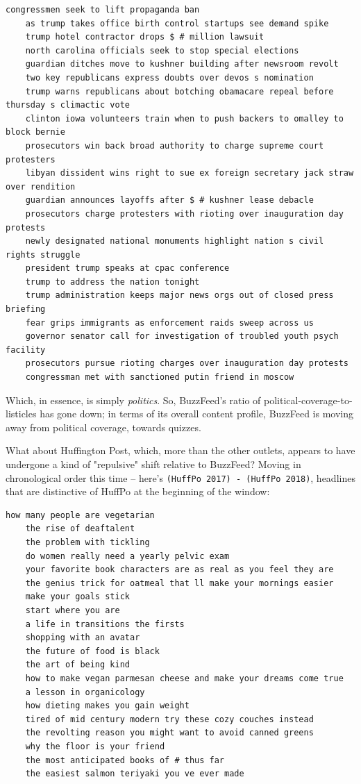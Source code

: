 \documentclass{scrartcl}
\begin{document}
\begin{lstlisting}[basicstyle=\tiny\hlfont]
    congressmen seek to lift propaganda ban
    as trump takes office birth control startups see demand spike
    trump hotel contractor drops $ # million lawsuit
    north carolina officials seek to stop special elections
    guardian ditches move to kushner building after newsroom revolt
    two key republicans express doubts over devos s nomination
    trump warns republicans about botching obamacare repeal before thursday s climactic vote
    clinton iowa volunteers train when to push backers to omalley to block bernie
    prosecutors win back broad authority to charge supreme court protesters
    libyan dissident wins right to sue ex foreign secretary jack straw over rendition
    guardian announces layoffs after $ # kushner lease debacle
    prosecutors charge protesters with rioting over inauguration day protests
    newly designated national monuments highlight nation s civil rights struggle
    president trump speaks at cpac conference
    trump to address the nation tonight
    trump administration keeps major news orgs out of closed press briefing
    fear grips immigrants as enforcement raids sweep across us
    governor senator call for investigation of troubled youth psych facility
    prosecutors pursue rioting charges over inauguration day protests
    congressman met with sanctioned putin friend in moscow
\end{lstlisting}

Which, in essence, is simply \textit{politics}. So, BuzzFeed's ratio of political-coverage-to-listicles has gone down; in terms of its overall content profile, BuzzFeed is moving away from political coverage, towards quizzes.

What about Huffington Post, which, more than the other outlets, appears to have undergone a kind of "repulsive" shift relative to BuzzFeed? Moving in chronological order this time -- here's \texttt{(HuffPo 2017) - (HuffPo 2018)}, headlines that are distinctive of HuffPo at the beginning of the window:

\begin{lstlisting}[basicstyle=\tiny\hlfont]
    how many people are vegetarian
    the rise of deaftalent
    the problem with tickling
    do women really need a yearly pelvic exam
    your favorite book characters are as real as you feel they are
    the genius trick for oatmeal that ll make your mornings easier
    make your goals stick
    start where you are
    a life in transitions the firsts
    shopping with an avatar
    the future of food is black
    the art of being kind
    how to make vegan parmesan cheese and make your dreams come true
    a lesson in organicology
    how dieting makes you gain weight
    tired of mid century modern try these cozy couches instead
    the revolting reason you might want to avoid canned greens
    why the floor is your friend
    the most anticipated books of # thus far
    the easiest salmon teriyaki you ve ever made
\end{lstlisting}
\end{document}
